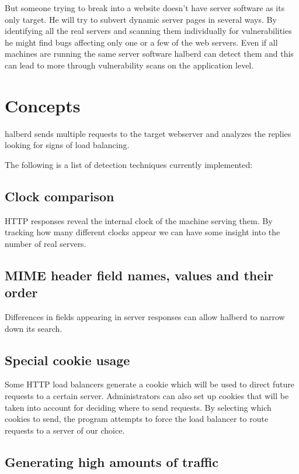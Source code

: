 \documentclass[a4paper]{book}
\begin{document}
But someone trying to break into a website doesn't have server software as its
only target. He will try to subvert dynamic server pages in several ways.  By
identifying all the real servers and scanning them individually for
vulnerabilities he might find bugs affecting only one or a few of the web
servers. Even if all machines are running the same server software halberd can
detect them and this can lead to more through vulnerability scans on the
application level.

\chapter{Concepts}

halberd sends multiple requests to the target webserver and analyzes the
replies looking for signs of load balancing.

The following is a list of detection techniques currently implemented:

\section{Clock comparison}

HTTP responses reveal the internal clock of the machine serving them. By
tracking how many different clocks appear we can have some insight into the
number of real servers.

\section{MIME header field names, values and their order}

Differences in fields appearing in server responses can allow halberd to
narrow down its search.

\section{Special cookie usage}

Some HTTP load balancers generate a cookie which will be used to direct future
requests to a certain server. Administrators can also set up cookies that will
be taken into account for deciding where to send requests. By selecting which
cookies to send, the program attempts to force the load balancer to route
requests to a server of our choice.

\section{Generating high amounts of traffic}
\end{document}

